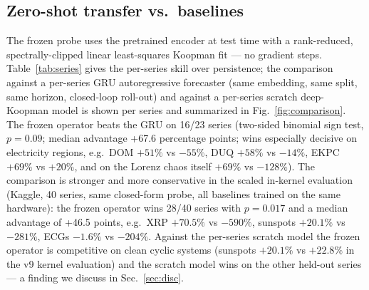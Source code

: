 \documentclass[11pt]{article}
\begin{document}
\subsection{Zero-shot transfer vs.\ baselines}
\label{sec:zs}
The frozen probe uses the pretrained encoder at test time with a rank-reduced,
spectrally-clipped linear least-squares Koopman fit --- no gradient steps.
Table~\ref{tab:series} gives the per-series skill over persistence; the
comparison against a per-series GRU autoregressive forecaster (same
embedding, same split, same horizon, closed-loop roll-out) and against a
per-series scratch deep-Koopman model is shown per series and summarized in
Fig.~\ref{fig:comparison}. The frozen operator beats the GRU on 16/23 series
(two-sided binomial sign test, $p=0.09$; median advantage +67.6 percentage
points; wins especially decisive on electricity regions, e.g.\ DOM $+51\%$
vs $-55\%$, DUQ $+58\%$ vs $-14\%$, EKPC $+69\%$ vs $+20\%$, and on the
Lorenz chaos itself $+69\%$ vs $-128\%$). The comparison is stronger and
more conservative in the scaled in-kernel evaluation (Kaggle, 40 series,
same closed-form probe, all baselines trained on the same hardware): the
frozen operator wins 28/40 series with $p=0.017$ and a median advantage of
+46.5 points, e.g.\ XRP $+70.5\%$ vs $-590\%$, sunspots $+20.1\%$ vs
$-281\%$, ECGs $-1.6\%$ vs $-204\%$. Against the per-series scratch model the frozen operator is
competitive on clean cyclic systems (sunspots $+20.1\%$ vs $+22.8\%$ in the
v9 kernel evaluation) and the scratch model wins on the other
held-out series --- a finding we discuss in Sec.~\ref{sec:disc}.
\end{document}
